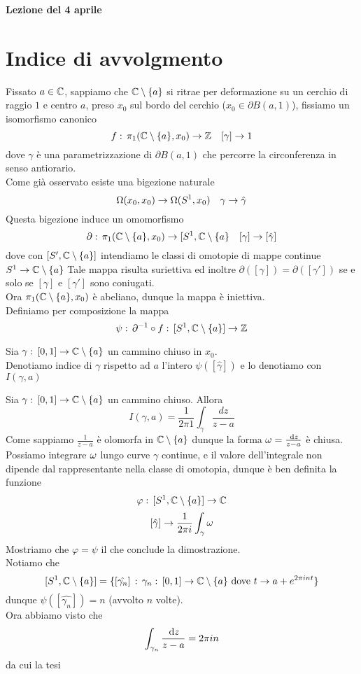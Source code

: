 


\textbf{Lezione del 4 aprile}
\section{Indice di avvolgmento}
Fissato $a\in \mathbb{C}$, sappiamo che $\mathbb{C}\setminus \{a  \}$ si ritrae per deformazione su un cerchio di raggio $1$ e centro $a$, preso $x_0$ sul bordo del cerchio ($x_0\in \partial B(a,1)$), fissiamo un isomorfismo canonico
$$ f:\, \pi_1(\mathbb{C}\setminus \{a \}, x_0) \to \mathbb{Z} \quad [\gamma] \to 1 $$
dove $\gamma$ \`e una parametrizzazione di $\partial B(a,1)$ che percorre la circonferenza in senso antiorario.\\
Come gi\`a osservato esiste  una bigezione naturale
$$ \Omega(x_0,x_0) \to \Omega(S^1, x_0) \quad \gamma \to \hat{\gamma}$$
Questa bigezione induce un omomorfismo 
$$\partial:\, \pi_1(\mathbb{C}\setminus\{ a \}, x_0) \to [ S^1, \mathbb{C} \setminus\{ a \} \quad [\gamma]\to [\hat{\gamma}]$$
dove con $[S', \mathbb{C} \setminus \{a \}]$ intendiamo le classi di omotopie di mappe continue $S^1\to \mathbb{C}\setminus\{a\}$
Tale mappa risulta suriettiva ed inoltre $\partial([\gamma]) = \partial([\gamma'])$ se e solo se $[\gamma]$ e $[\gamma']$ sono coniugati.\\
Ora $\pi_1(\mathbb{C}\setminus\{a\}, x_0)$ \`e abeliano, dunque la mappa \`e iniettiva.\\
Definiamo per composizione la mappa 
$$ \psi:\,  \partial^{-1}\circ f:\,[S^1, \mathbb{C}\setminus\{a\}] \to \mathbb{Z}$$
\begin{defn}Sia $\gamma:\, [0,1]\to \mathbb{C}\setminus \{a\}$ un cammino chiuso in $x_0$.\\
Denotiamo indice di $\gamma$ rispetto ad $a$ l'intero $\psi([\hat{\gamma}])$ e lo denotiamo con $I(\gamma, a)$
\end{defn}
\begin{thm}Sia $\gamma:\, [0,1]\to \mathbb{C}\setminus\{a\}$ un cammino chiuso. Allora 
$$ I(\gamma, a) = \frac{1}{2\pi 1 }\int_\gamma \frac{dz}{z-a}$$
\proof Come sappiamo $\frac{1}{z-a}$ \`e olomorfa in $\mathbb{C}\setminus \{a\}$ dunque la forma $\omega=\frac{\, \mathrm{d}z}{z-a}$ \`e chiusa.\\
Possiamo integrare $\omega$ lungo curve $\gamma$ continue, e il valore dell'integrale non dipende dal rappresentante nella classe di omotopia, dunque \`e ben definita la funzione 
$$ \varphi:\, [S^1, \mathbb{C}\setminus\{a \}] \to \mathbb{C}$$ 
$$ [\hat{\gamma}]\to \frac{1}{2\pi i }\int_\gamma \omega $$
Mostriamo che $\varphi = \psi$ il che conclude la dimostrazione.\\
Notiamo che 
$$ [S^1, \mathbb{C}\setminus\{ a\}]  =\{ [\hat{\gamma_n}]\, : \, \gamma_n:\, [0,1]\to \mathbb{C}\setminus \{a\} \text{ dove } t \to a + e^{2\pi i n t}\}$$
dunque $\psi([\hat{\gamma_n}])  =n$ (avvolto $n$ volte).\\
Ora abbiamo visto che 
$$ \int_{\gamma_n} \frac{\, \mathrm{d}z}{z-a} =2\pi i n $$ 
da cui la tesi 
\end{thm}
